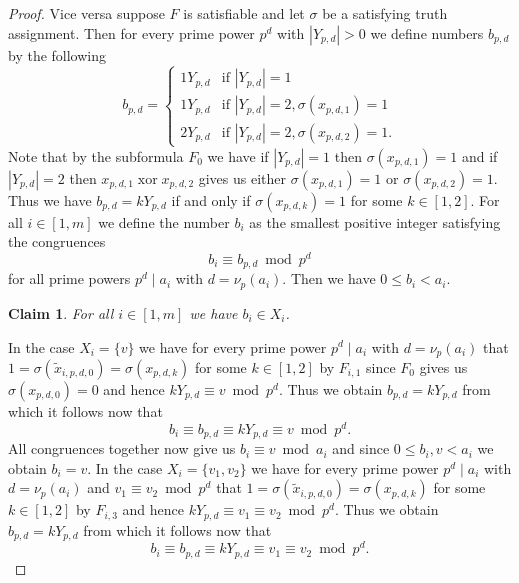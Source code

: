 \documentclass{article}
\newtheorem{claim}{Claim}
\DeclareMathOperator{\xor}{xor}
\begin{document}
\begin{proof}
Vice versa suppose $F$ is satisfiable and let $\sigma$ be a satisfying truth assignment. Then for every prime power $p^d$ with $|Y_{p,d}| > 0$ we define numbers $b_{p,d}$ by the following
\begin{displaymath}
b_{p,d} = \begin{cases}
1Y_{p,d} & \text{if } |Y_{p,d}| = 1\\
1Y_{p,d} & \text{if } |Y_{p,d}| = 2, \sigma(x_{p,d,1}) = 1\\
2Y_{p,d} & \text{if } |Y_{p,d}| = 2, \sigma(x_{p,d,2}) = 1.
\end{cases}
\end{displaymath}
Note that by the subformula $F_0$ we have if $|Y_{p,d}| = 1$ then $\sigma(x_{p,d,1}) = 1$ and if $|Y_{p,d}| = 2$ then $x_{p,d,1} \xor x_{p,d,2}$ gives us either $\sigma(x_{p,d,1}) = 1$ or $\sigma(x_{p,d,2}) = 1$. Thus we have $b_{p,d} = kY_{p,d}$ if and only if $\sigma(x_{p,d,k}) = 1$ for some $k \in [1,2]$. For all $i \in [1,m]$ we define the number $b_i$ as the smallest positive integer satisfying the congruences
\begin{displaymath}
b_i \equiv b_{p,d} \bmod p^d
\end{displaymath}
for all prime powers $p^d \mid a_i$ with $d = \nu_p(a_i)$. Then we have $0 \leq b_i < a_i$.
\begin{claim}\label{claimbiinXi}
For all $i \in [1,m]$ we have $b_i \in X_i$.
\end{claim}
In the case $X_i = \{v\}$ we have for every prime power $p^d \mid a_i$ with $d = \nu_p(a_i)$ that $1 = \sigma(\tilde{x}_{i,p,d,0}) = \sigma(x_{p,d,k})$ for some $k \in [1,2]$ by $F_{i,1}$ since $F_0$ gives us $\sigma(x_{p,d,0}) = 0$ and hence $kY_{p,d} \equiv v \bmod p^d$. Thus we obtain $b_{p,d} = kY_{p,d}$ from which it follows now that
\begin{displaymath}
b_i \equiv b_{p,d} \equiv kY_{p,d} \equiv v \bmod p^d.
\end{displaymath}
All congruences together now give us $b_i \equiv v \bmod a_i$ and since $0 \leq b_i,v < a_i$ we obtain $b_i = v$. In the case $X_i = \{v_1,v_2\}$ we have for every prime power $p^d \mid a_i$ with $d = \nu_p(a_i)$ and $v_1 \equiv v_2 \bmod p^d$ that $1 = \sigma(\tilde{x}_{i,p,d,0}) = \sigma(x_{p,d,k})$ for some $k \in [1,2]$ by $F_{i,3}$ and hence $kY_{p,d} \equiv v_1 \equiv v_2 \bmod p^d$. Thus we obtain $b_{p,d} = kY_{p,d}$ from which it follows now that
\begin{displaymath}
b_i \equiv b_{p,d} \equiv kY_{p,d} \equiv v_1 \equiv v_2 \bmod p^d.
\end{displaymath}

\end{proof}
\end{document}
